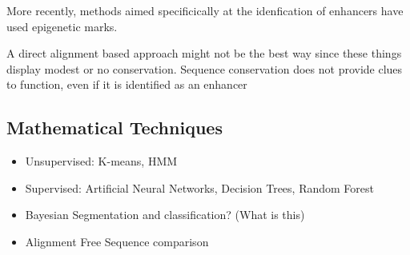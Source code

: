         More recently, methods aimed specificically at the idenfication of enhancers have used epigenetic marks.


        
        
        

        
        
        
        A direct alignment based approach might not be the best way since these things display modest or no conservation. Sequence conservation does not provide clues to function, even if it is identified as an enhancer~\cite{pennacchio2013enhancers}
        

        \subsection{Mathematical Techniques}
        \begin{itemize}
        	\item Unsupervised: K-means, HMM
        	\item Supervised: Artificial Neural Networks, Decision Trees, Random Forest
        	\item Bayesian Segmentation and classification? (What is this)
        	\item Alignment Free Sequence comparison 
        \end{itemize}

            
